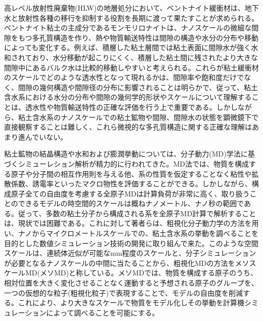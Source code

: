 高レベル放射性廃棄物(HLW)の地層処分において、ベントナイト緩衝材は、地下水と放射性各種の移行を抑制する役割を長期に渡って果たすことが求められる。ベントナイト粘土の主成分であるモンモリロナイトは、ナノスケールの微細な間隙をもつ多孔質構造を作り、熱や物質輸送特性は間隙の構造や水分の分布や移動によっても変化する。例えば、積層した粘土層間では粘土表面に間隙水が強く水和されており、水分移動が起こりにくく、積層した粘土間に残されたより大きな間隙中にあるバルク水は比較的移動しやすいと考えられる。これらが粘土緩衝材のスケールでどのような透水性となって現れるかは、間隙率や飽和度だけでなく、間隙の幾何構造や間隙径の分布に影響されることは明らかで、従って、粘土含水系における水分の分布や間隙の幾何学的形状やスケールについて理解することは、透水性や物質輸送特性の正確な評価を行う上で重要である。しかしながら、粘土含水系のナノスケールでの粘土鉱物や間隙、間隙水の状態を顕微鏡下で直接観察することは難しく、これら微視的な多孔質構造に関する正確な理解はあまり進んでいない。

粘土鉱物の結晶構造や水和および膨潤挙動については、分子動力(MD)学法に基づくシミューレション解析が精力的に行われてきた。MD法では、物質を構成する原子や分子間の相互作用則を与える他、系の性質を仮定することなく粘性や拡散係数、誘電率といったマクロ物性を評価することができる。しかしながら、構成原子全ての自由度を考慮する全原子MDは計算負荷が非常に高く、取り扱うことのできるモデルの時空間的スケールは概ねナノメートル、ナノ秒の範囲である。従って、多数の粘土分子から構成される系を全原子MD計算で解析することは、現状では困難である。これに対して著者らは、粗視化分子動力学の方法を用い、ナノからマイクロメートルスケールでの、粘土含水系の挙動を調べることを目的とした数値シミュレーション技術の開発に取り組んで来た。このような空間スケールは、連続体近似が可能なmm程度のスケールと、分子シミュレーションが必要となるナノスケールの中間に当たることから、粗視化MDの方法をメソスケールMD(メソMD)と称している。メソMDでは、物質を構成する原子のうち、相対位置を大きく変化させることなく運動すると予想される原子のグループを、一つの仮想的な粒子(粗視化粒子)で表現することで、モデルの自由度を削減する。これにより、より大きなスケールで物質をモデル化しその挙動を計算機シミュレーションによって調べることを可能にする。


